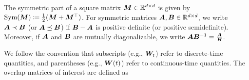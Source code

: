 \smallskip
 The symmetric part of a square matrix $\boldsymbol{M} \in \mathbb{R}^{d \times d}$ is given by $\mathrm{Sym}(\boldsymbol{M}) \coloneqq \frac{1}{2}(\boldsymbol{M} + \boldsymbol{M}^\top)$. For symmetric matrices $\boldsymbol{A}, \boldsymbol{B} \in \mathbb{R}^{d \times d}$, we write $\boldsymbol{A} \prec \boldsymbol{B}$ (or $\boldsymbol{A} \preceq \boldsymbol{B}$) if $\boldsymbol{B} - \boldsymbol{A}$ is positive definite (or positive semidefinite). 
 Moreover, if $\boldsymbol{A}$ and $\boldsymbol{B}$ are mutually diagonalizable, we write $\boldsymbol{A} \boldsymbol{B}^{-1} = \frac{\boldsymbol{A}}{\boldsymbol{B}}$.
 
\smallskip
We follow the convention that subscripts (e.g., $\boldsymbol{W}_t$) refer to discrete-time quantities, and parentheses (e.g., $\boldsymbol{W}(t)$) refer to continuous-time quantities. The overlap matrices of interest are defined as


